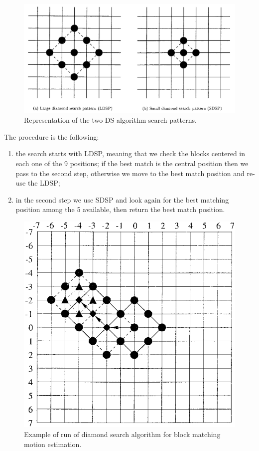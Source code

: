 \begin{figure}
    \centering
    \includegraphics[width=.95\linewidth]{../assets/images/ds-search-patterns.png}
    \caption{Representation of the two DS algorithm search patterns.}
    \label{fig:ds-search-patterns}
\end{figure}

The procedure is the following:
\begin{enumerate}
    \item the search starts with LDSP, meaning that we check the blocks centered in each one of the 9 positions; if the best match is the central position then we pass to the second step, otherwise we move to the best match position and re-use the LDSP;
    \item in the second step we use SDSP and look again for the best matching position among the 5 available, then return the best match position.
\end{enumerate}

\begin{figure}
    \centering
    \includegraphics[width=.95\linewidth]{../assets/images/ds-exe.png}
    \caption{Example of run of diamond search algorithm for block matching motion estimation.}
    \label{fig:diamond-search-example}
\end{figure}

